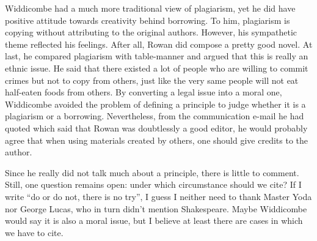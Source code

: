 \documentclass{writing}
\begin{document}
Widdicombe had a much more traditional view of plagiarism, yet he did
have positive attitude towards creativity behind borrowing. To him,
plagiarism is copying without attributing to the original authors.
However, his sympathetic theme reflected his feelings. After all, Rowan
did compose a pretty good novel. At last, he compared plagiarism with
table-manner and argued that this is really an ethnic issue. He said
that there existed a lot of people who are willing to commit crimes but
not to copy from others, just like the very same people will not eat
half-eaten foods from others. By converting a legal issue into a moral
one, Widdicombe avoided the problem of defining a principle to judge
whether it is a plagiarism or a borrowing. Nevertheless, from the
communication e-mail he had quoted which said that Rowan was doubtlessly
a good editor, he would probably agree that when using materials created
by others, one should give credits to the author.

Since he really did not talk much about a principle, there is little to
comment. Still, one question remains open: under which circumstance
should we cite? If I write ``do or do not, there is no try'', I guess I
neither need to thank Master Yoda nor George Lucas, who in turn didn't
mention Shakespeare. Maybe Widdicombe would say it is also a moral
issue, but I believe at least there are cases in which we have to cite.
\end{document}
